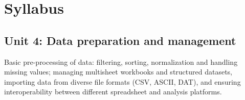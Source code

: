 \section*{Syllabus}

    \subsection*{Unit 4: Data preparation and management}
        Basic pre-processing of data: filtering, sorting, normalization and handling missing values; managing multisheet workbooks and structured datasets, importing data from diverse file formats (CSV, ASCII, DAT), and ensuring interoperability between different spreadsheet and analysis platforms.